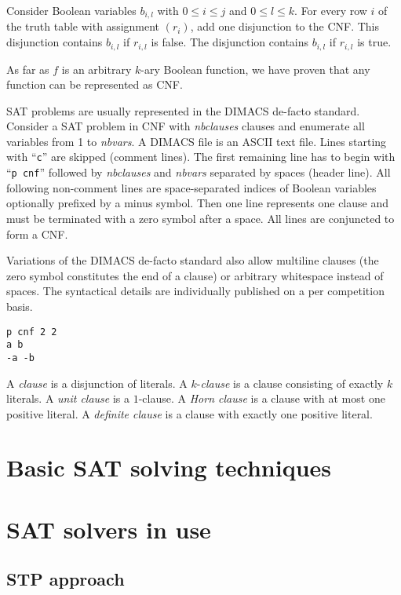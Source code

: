 Consider Boolean variables $b_{i,l}$ with $0 \leq i \leq j$ and $0 \leq l \leq k$.
For every row $i$ of the truth table with assignment $(r_i)$, add one disjunction to the CNF.
This disjunction contains $b_{i,l}$ if $r_{i,l}$ is false.
The disjunction contains $b_{i,l}$ if $r_{i,l}$ is true.

As far as $f$ is an arbitrary $k$-ary Boolean function, we have proven that
any function can be represented as CNF.

SAT problems are usually represented in the DIMACS de-facto standard.
Consider a SAT problem in CNF with \emph{nbclauses} clauses and
enumerate all variables from 1 to \emph{nbvars}. A DIMACS file is an ASCII text
file. Lines starting with \enquote{\texttt{c}} are skipped (comment lines).
The first remaining line has to begin with \enquote{\texttt{p cnf}} followed by
\emph{nbclauses} and \emph{nbvars} separated by spaces (header line).
All following non-comment lines are space-separated indices of Boolean variables
optionally prefixed by a minus symbol. Then one line represents one clause and
must be terminated with a zero symbol after a space. All lines are conjuncted
to form a CNF.

Variations of the DIMACS de-facto standard also allow multiline clauses (the
zero symbol constitutes the end of a clause) or arbitrary whitespace instead of
spaces. The syntactical details are individually published on a per competition
basis.

\renewcommand{\lstlistingname}{Listing}  %
\begin{lstlisting}[caption={Display~\ref{eq:xor} represented in DIMACS format}]
p cnf 2 2
a b
-a -b
\end{lstlisting}

\begin{defi}
  A \emph{clause} is a disjunction of literals.
  A $k$-\emph{clause} is a clause consisting of exactly $k$ literals.
  A \emph{unit clause} is a $1$-clause.
  A \emph{Horn clause} is a clause with at most one positive literal.
  A \emph{definite clause} is a clause with exactly one positive literal.
\end{defi}


\section{Basic SAT solving techniques}
\section{SAT solvers in use}
\subsection{STP approach}
